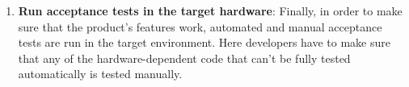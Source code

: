 \begin{enumerate}
    \item \textbf{Run acceptance tests in the target hardware}: Finally, in order to make sure that the product's features work, automated and manual acceptance tests are run in the target environment. Here developers have to make sure that any of the hardware-dependent code that can't be fully tested automatically is tested manually.
\end{enumerate}